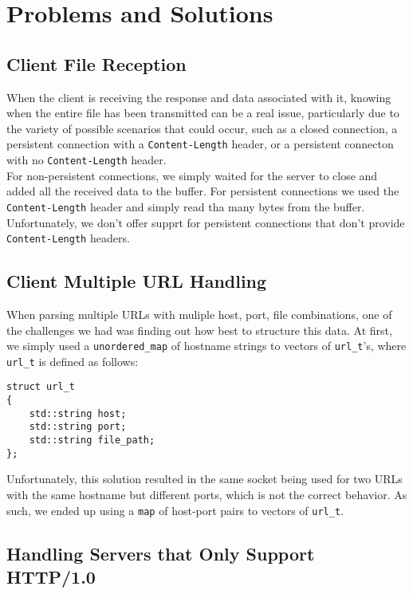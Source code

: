 \documentclass{article}
\begin{document}
\section{Problems and Solutions}

\subsection{Client File Reception}

When the client is receiving the response and data associated with it, knowing when the entire file has been transmitted can be a real issue, particularly due to the variety of possible scenarios that could occur, such as a closed connection, a persistent connection with a \texttt{Content-Length} header, or a persistent connecton with no \texttt{Content-Length} header. \\

\noindent
For non-persistent connections, we simply waited for the server to close and added all the received data to the buffer. For persistent connections we used the \texttt{Content-Length} header and simply read tha many bytes from the buffer. Unfortunately, we don't offer supprt for persistent connections that don't provide \texttt{Content-Length} headers.

\subsection{Client Multiple URL Handling}

When parsing multiple URLs with muliple host, port, file combinations, one of the challenges we had was finding out how best to structure this data. At first, we simply used a \texttt{unordered\_map} of hostname strings to vectors of \texttt{url\_t}'s, where \texttt{url\_t} is defined as follows: 

\begin{lstlisting}[style=cstyle]
struct url_t
{
    std::string host;
    std::string port;
    std::string file_path;
};
\end{lstlisting} 

\noindent
Unfortunately, this solution resulted in the same socket being used for two URLs with the same hostname but different ports, which is not the correct behavior. As such, we ended up using a \texttt{map} of host-port pairs to vectors of \texttt{url\_t}.

\subsection{Handling Servers that Only Support HTTP/1.0}
\end{document}
